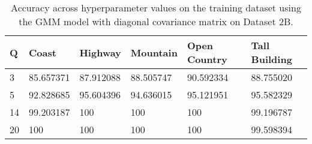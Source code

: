 \begin{table}[H]
\centering
\begin{tabular}{l l l l l l}
\hline
\hline
\textbf{Q} & \textbf{Coast} & \textbf{Highway} & \textbf{Mountain} & \textbf{Open Country} & \textbf{Tall Building} \\
\hline
\hline
3 & 85.657371 & 87.912088 & 88.505747 & 90.592334 & 88.755020\\
5 & 92.828685 & 95.604396 & 94.636015 & 95.121951 & 95.582329 \\
14 & 99.203187 & 100 & 100 & 100 & 99.196787 \\
20 & 100 & 100 & 100 & 100 & 99.598394 \\
\hline
\end{tabular}
\caption{Accuracy across hyperparameter values on the training dataset using the GMM model with diagonal covariance matrix on Dataset 2B.}
\label{tab:2B_diag_train}
\end{table}
